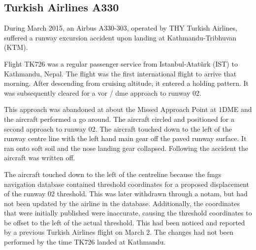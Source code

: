 \subsection{Turkish Airlines A330} \label{bkm:accinc:turkisha330}
During March 2015, an Airbus A330-303, operated by THY Turkish Airlines, suffered a runway excursion accident upon landing at Kathmandu-Tribhuvan (KTM).

Flight TK726 was a regular passenger service from Istanbul-Atat{\"u}rk (IST) to Kathmandu, Nepal. The flight was the first international flight to arrive that morning. After descending from cruising altitude, it entered a holding pattern. It was subsequently cleared for a \gls{vor} / \gls{dme} approach to runway 02. 

This approach was abandoned at about the Missed Approach Point at 1DME and the aircraft performed a go around. The aircraft circled and positioned for a second approach to runway 02. The aircraft touched down to the left of the runway centre line with the left hand main gear off the paved runway surface. It ran onto soft soil and the nose landing gear collapsed. Following the accident the aircraft was written off.

The aircraft touched down to the left of the centreline because the \gls{fmgs} navigation database contained threshold coordinates for a proposed displacement of the runway 02 threshold. This was later withdrawn through a \gls{notam}, but had not been updated by the airline in the database. Additionally, the coordinates that were initially published were inaccurate, causing the threshold coordinates to be offset to the left of the actual threshold. This had been noticed and reported by a previous Turkish Airlines flight on March 2. The changes had not been performed by the time TK726 landed at Kathmandu. 

